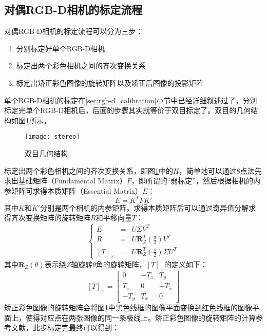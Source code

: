 \subsection{对偶RGB-D相机的标定流程}
对偶RGB-D相机的标定流程可以分为三步：
\begin{enumerate}[Step 1]
\item 分别标定好单个RGB-D相机
\item 标定出两个彩色相机之间的齐次变换关系
\item 标定出矫正彩色图像的旋转矩阵以及矫正后图像的投影矩阵
\end{enumerate}
单个RGB-D相机的标定在\ref{sec:rgb-d_calibration}小节中已经详细叙述过了，分别标定完单个RGB-D相机后，后面的步骤其实就等价于双目标定了。双目的几何结构如图\ref{fig:stereo}所示，
\begin{figure}[!ht]
  \centering
  \texttt{[image: stereo]}
  \caption{双目几何结构}
  \label{fig:stereo}
\end{figure}
标定出两个彩色相机之间的齐次变换关系，即图\ref{fig:stereo}中的$H$，简单地可以通过8点法\cite{Sur2008}先求出基础矩阵（Fundamental Matrix）$F$，即所谓的“弱标定”，然后根据相机的内参矩阵可求得本质矩阵（Essential Matrix）$E$：
\begin{equation}
  E = K^{T}FK'
\end{equation}
其中$K$和$K'$分别是两个相机的内参矩阵。求得本质矩阵后可以通过奇异值分解求得齐次变换矩阵的旋转矩阵$R$和平移向量$T$：
\begin{equation}
  \left\{\begin{array}{ccc}
    E &=& U\Sigma V^T \\
    R &=& U\bm{R}_Z^T(\frac{\pi}{2})V^T \\
    \left[T\right]_{\times} &=& U\bm{R}_Z^T(\frac{\pi}{2})\Sigma U^T
  \end{array}
  \right.
\end{equation}
其中$\bm{R}_Z(\theta)$表示绕$Z$轴旋转$\theta$角的旋转矩阵，$\left[T\right]_{\times}$的定义如下：
\begin{equation}
  \left[T\right]_{\times} = \left[
    \begin{array}{ccc}
      0&-T_z&T_y\\
      T_z&0&-T_x \\
      -T_y&T_x&0
    \end{array}
  \right]
\end{equation}
矫正彩色图像的旋转矩阵会将图\ref{fig:stereo}中黑色线框的图像平面变换到红色线框的图像平面上，使得对应点在两张图像的同一条极线上。矫正彩色图像的旋转矩阵的计算参考文献\cite{Loop2001}，此步标定完最终可以得到：
